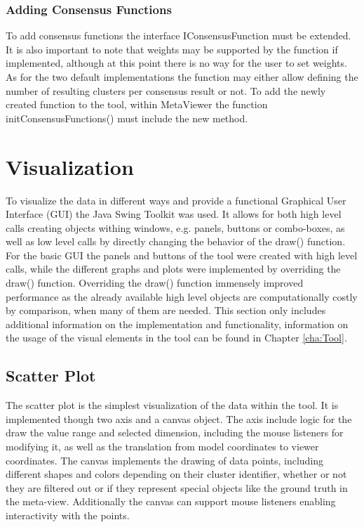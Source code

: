 \documentclass[
	a4paper,
	english,
	twoside,
	openright,               
	11pt                            
	]{report}
\begin{document}
\subsubsection*{Adding Consensus Functions}
To add consensus functions the interface IConsensusFunction must be extended. It is also important to note that weights may be supported by the function if implemented, although at this point there is no way for the user to set weights. As for the two default implementations the function may either allow defining the number of resulting clusters per consensus result or not. To add the newly created function to the tool, within MetaViewer the function initConsensusFunctions() must include the new method.

\section{Visualization}

To visualize the data in different ways and provide a functional Graphical User Interface (GUI) the Java Swing \cite{javaswing} Toolkit was used. It allows for both high level calls creating objects withing windows, e.g. panels, buttons or combo-boxes, as well as low level calls by directly changing the behavior of the draw() function. For the basic GUI the panels and buttons of the tool were created with high level calls, while the different graphs and plots were implemented by overriding the draw() function. Overriding the draw() function immensely improved performance as the already available high level objects are computationally costly by comparison, when many of them are needed. This section only includes additional information on the implementation and functionality, information on the usage of the visual elements in the tool can be found in Chapter \ref{cha:Tool}.

\subsection{Scatter Plot}
The scatter plot is the simplest visualization of the data within the tool. It is implemented though two axis and a canvas object. The axis include logic for the draw the value range and selected dimension, including the mouse listeners for modifying it, as well as the translation from model coordinates to viewer coordinates. The canvas implements the drawing of data points, including different shapes and colors depending on their cluster identifier, whether or not they are filtered out or if they represent special objects like the ground truth in the meta-view. Additionally the canvas can support mouse listeners enabling interactivity with the points.
\end{document}
